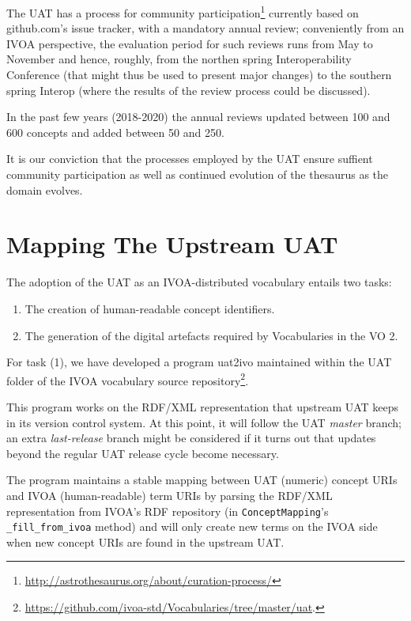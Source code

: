 \documentclass[11pt,a4paper]{ivoa}
\begin{document}
The UAT has a process for community
participation\footnote{\url{http://astrothesaurus.org/about/curation-process/}}
currently based on github.com's issue tracker, with a mandatory annual
review; conveniently from an IVOA perspective, the evaluation period for
such reviews runs from May to November and hence, roughly, from the
northen spring Interoperability Conference (that 
might thus be used to present major
changes) to the southern spring Interop (where the results of the review
process could be discussed).

In the past few years (2018-2020) the annual reviews updated between 100
and 600 concepts and added between 50 and 250.

It is our conviction that the processes employed by the UAT ensure
suffient community participation as well as continued evolution of the
thesaurus as the domain evolves.

\section{Mapping The Upstream UAT}

The adoption of the UAT as an IVOA-distributed vocabulary entails two
tasks:

\begin{enumerate}
\item The creation of human-readable concept identifiers.
\item The generation of the digital artefacts required by Vocabularies
in the VO 2.
\end{enumerate}

For task (1), we have developed a program uat2ivo maintained within
the UAT folder of the IVOA vocabulary source 
repository\footnote{\url{https://github.com/ivoa-std/Vocabularies/tree/master/uat}.}.

This program works on the RDF/XML representation that upstream UAT
keeps in its version control system.  At this point, it will follow the
UAT \emph{master} branch; an extra \emph{last-release} branch might be
considered if it turns out that updates beyond the regular UAT release
cycle become necessary.

The program maintains a stable mapping between UAT (numeric) concept
URIs and IVOA (human-readable) term URIs by parsing the RDF/XML
representation from IVOA's RDF repository (in \verb|ConceptMapping|'s
\verb|_fill_from_ivoa| method) and will only create new terms on the
IVOA side when new concept URIs are found in the upstream UAT.
\end{document}
